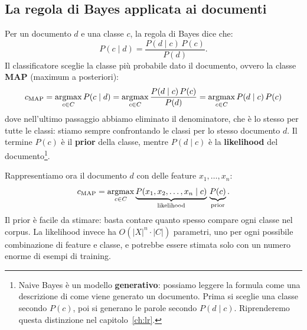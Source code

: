 \subsection{La regola di Bayes applicata ai documenti}
Per un documento $d$ e una classe $c$, la regola di Bayes dice che:
\begin{equation}
P(c \mid d) = \frac{P(d \mid c)\, P(c)}{P(d)}.
\end{equation}
Il classificatore sceglie la classe più probabile dato il documento, ovvero la classe \textbf{MAP} (maximum a posteriori):
\begin{equation}
c_{\text{MAP}} = \operatorname*{argmax}_{c \in C} P(c \mid d) = \operatorname*{argmax}_{c \in C} \frac{P(d \mid c)\, P(c)}{P(d)} = \operatorname*{argmax}_{c \in C} P(d \mid c)\, P(c)
\end{equation}
dove nell'ultimo passaggio abbiamo eliminato il denominatore, che è lo stesso per tutte le classi: stiamo sempre confrontando le classi per lo stesso documento $d$. Il termine $P(c)$ è il \textbf{prior} della classe, mentre $P(d \mid c)$ è la \textbf{likelihood} del documento\footnote{Naive Bayes è un modello \textbf{generativo}: possiamo leggere la formula come una descrizione di come viene generato un documento. Prima si sceglie una classe secondo $P(c)$, poi si generano le parole secondo $P(d \mid c)$. Riprenderemo questa distinzione nel capitolo~\ref{ch:lr}.}.

Rappresentiamo ora il documento $d$ con delle feature $x_1, \dots, x_n$:
\begin{equation}
c_{\text{MAP}} = \operatorname*{argmax}_{c \in C} \underbrace{P(x_1, x_2, \dots, x_n \mid c)}_{\text{likelihood}}\, \underbrace{P(c)}_{\text{prior}}.
\end{equation}
Il prior è facile da stimare: basta contare quanto spesso compare ogni classe nel corpus. La likelihood invece ha $O(|X|^n \cdot |C|)$ parametri, uno per ogni possibile combinazione di feature e classe, e potrebbe essere stimata solo con un numero enorme di esempi di training.

